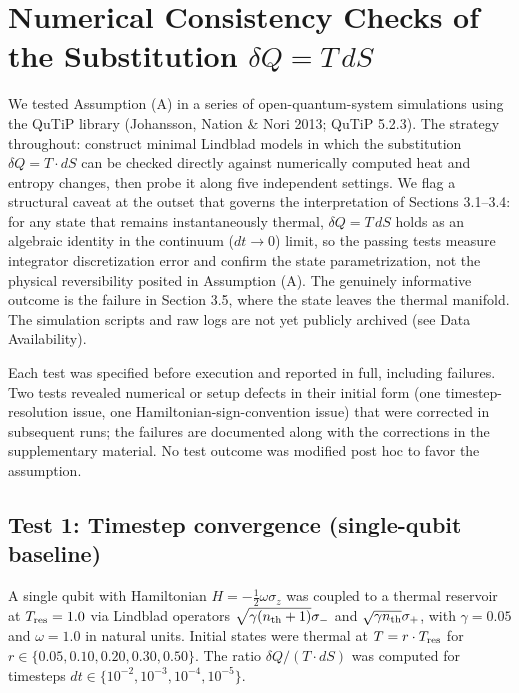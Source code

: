 \documentclass[11pt]{article}
\begin{document}
\section{\texorpdfstring{Numerical Consistency Checks of the Substitution \(\delta Q = T\,dS\)}{Numerical Consistency Checks of the Substitution \textbackslash delta Q = T\textbackslash,dS}}\label{numerical-consistency-checks-of-the-substitution-delta-q-tds}

We tested Assumption (A) in a series of open-quantum-system simulations using the QuTiP library (Johansson, Nation \& Nori 2013; QuTiP 5.2.3). The strategy throughout: construct minimal Lindblad models in which the substitution \(\delta Q = T \cdot dS\) can be checked directly against numerically computed heat and entropy changes, then probe it along five independent settings. We flag a structural caveat at the outset that governs the interpretation of Sections 3.1--3.4: for any state that remains instantaneously thermal, \(\delta Q = T\,dS\) holds as an algebraic identity in the continuum (\(dt\to0\)) limit, so the passing tests measure integrator discretization error and confirm the state parametrization, not the physical reversibility posited in Assumption (A). The genuinely informative outcome is the failure in Section 3.5, where the state leaves the thermal manifold. The simulation scripts and raw logs are not yet publicly archived (see Data Availability).

Each test was specified before execution and reported in full, including failures. Two tests revealed numerical or setup defects in their initial form (one timestep-resolution issue, one Hamiltonian-sign-convention issue) that were corrected in subsequent runs; the failures are documented along with the corrections in the supplementary material. No test outcome was modified post hoc to favor the assumption.

\subsection{Test 1: Timestep convergence (single-qubit baseline)}\label{test-1-timestep-convergence-single-qubit-baseline}

A single qubit with Hamiltonian \(H = -\frac{1}{2}\omega\sigma_z\) was coupled to a thermal reservoir at \(T_{\rm res} = 1.0\) via Lindblad operators \(\sqrt{\gamma(n_{\rm th}+1)}\sigma_-\) and \(\sqrt{\gamma n_{\rm th}}\sigma_+\), with \(\gamma = 0.05\) and \(\omega = 1.0\) in natural units. Initial states were thermal at \(T = r \cdot T_{\rm res}\) for \(r \in \{0.05, 0.10, 0.20, 0.30, 0.50\}\). The ratio \(\delta Q / (T \cdot dS)\) was computed for timesteps \(dt \in \{10^{-2}, 10^{-3}, 10^{-4}, 10^{-5}\}\).
\end{document}

